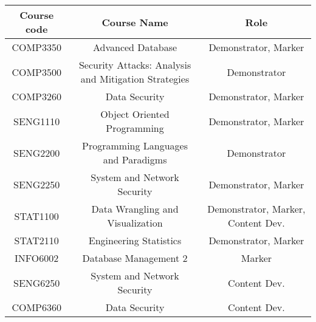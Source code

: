 \documentclass{myresume}
\begin{document}
        \begin{center}
        \begin{tabular}{ c | c | c }
                \hline
                \textbf{Course code} & \textbf{Course Name} &
                \textbf{Role} \\
                \hline
                \hline
                COMP3350 & Advanced Database & Demonstrator, Marker \\
                \hline
                COMP3500 & Security Attacks: Analysis and Mitigation Strategies & Demonstrator \\
                \hline
                COMP3260 & Data Security & Demonstrator, Marker \\
                \hline
                SENG1110 & Object Oriented Programming & Demonstrator, Marker \\
                \hline
                SENG2200 & Programming Languages and Paradigms & Demonstrator \\
                \hline
                SENG2250 & System and Network Security & Demonstrator, Marker \\
                \hline
                STAT1100 & Data Wrangling and Visualization & Demonstrator, Marker, Content Dev. \\
                \hline
                STAT2110 & Engineering Statistics & Demonstrator, Marker \\
                \hline
                INFO6002 & Database Management 2 & Marker \\
                \hline
                SENG6250 & System and Network Security & Content
                Dev. \\
                \hline
                COMP6360 & Data Security & Content Dev. \\
                \hline
        \end{tabular}
        \end{center}

\end{document}
